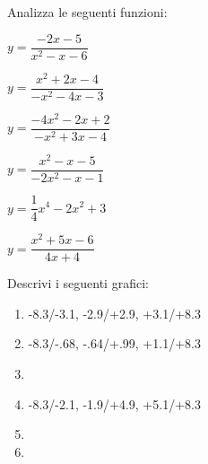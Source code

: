 \begin{esercizio}\label{ese:stufun.2e}
Analizza le seguenti funzioni:
\begin{multicols}{3}
 \begin{enumeratea}
  \item \(y = \dfrac{-2x-5}{x^2-x-6}\) \\ %
  \item \(y = \dfrac{x^2+2x-4}{-x^2-4x-3}\) %
  \item \(y = \dfrac{-4x^2-2x+2}{-x^2+3x-4}\) \\ %
  \item \(y = \dfrac{x^2-x-5}{-2x^2-x-1}\) %
  \item \(y = \dfrac{1}{4}x^4-2x^2+3\) \\ %
  \item \(y = \dfrac{x^2+5x-6}{4x+4}\) %
 \end{enumeratea}
\end{multicols}
\end{esercizio}

\bigskip

\begin{esercizio}\label{ese:stufun.3g}
Descrivi i seguenti grafici:
\begin{multicols}{2}
 \begin{enumerate} [left=0pt, label=\alph*)]
  \item \myp 
{} 
{-8.3/-3.1, -2.9/+2.9, +3.1/+8.3}%
  \item \myp 
{} 
{-8.3/-.68, -.64/+.99, +1.1/+8.3}%
  \item \myp 
{}%
  \item \myp 
{} 
{-8.3/-2.1, -1.9/+4.9, +5.1/+8.3}%
\item \myp 
{}%
\item \myp 
{}%
 \end{enumerate}
\end{multicols}
\end{esercizio}

